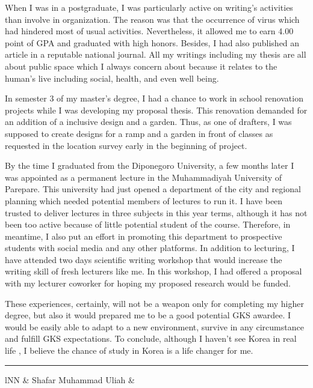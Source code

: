 \documentclass[../main.tex]{subfiles}
\begin{document}
\begin{tcolorbox}
	When I was in a postgraduate, I was particularly active on writing's activities than involve in organization. The reason was that the occurrence of virus which had hindered most of usual activities. Nevertheless, it allowed me to earn 4.00 point of GPA and graduated with high honors. Besides, I had also published an article in a reputable national journal. All my writings including my thesis are all about public space which I always concern about because it relates to the human's live including social, health, and even well being.

	In semester 3 of my master's degree, I had a chance to work in school renovation projects while I was developing my proposal thesis. This renovation demanded for an addition of a inclusive design and a garden. Thus, as one of drafters, I was supposed to create designs for a ramp and a garden in front of classes as requested in the location survey early in the beginning of project. %

	By the time I graduated from the Diponegoro University, a few months later I was appointed as a permanent lecture in the Muhammadiyah University of Parepare.
	This university had just opened a department of the city and regional planning which needed potential members of lectures to run it.
	I have been trusted to deliver lectures in three subjects in this year terms, although it has not been too active because of little potential student of the course.
	Therefore, in meantime, I also put an effort in promoting this department to prospective students with social media and any other platforms.
	In addition to lecturing, I have attended two days scientific writing workshop that would increase the writing skill of fresh lecturers like me. In this workshop, I had offered a proposal with my lecturer coworker for hoping my proposed research would be funded.

	These experiences, certainly, will not be a weapon only for completing my higher degree, but also it would prepared me to be a good potential GKS awardee. I would be easily able to adapt to a new environment, survive in any circumstance and fulfill GKS expectations. To conclude, although I haven't see Korea in real life , I believe the chance of study in Korea is a life changer for me.


\end{tcolorbox}
\vspace{4\baselineskip}

\noindent\rule{\textwidth}{.5pt}
\vspace{-5pt}
\begin{tabularx}{\textwidth}{lNN}
	\DTMtoday  &  Shafar Muhammad Uliah  &  \\
\end{tabularx}
\end{document}

